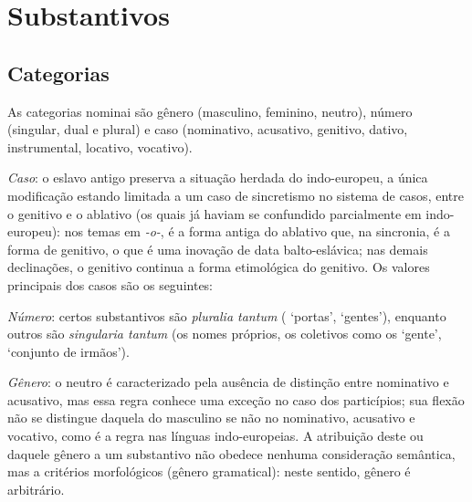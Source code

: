 \setlength{\textfloatsep}{5pt}

\section{Substantivos}

\subsection{Categorias}

As categorias nominai são gênero (masculino, feminino, neutro), número
(singular, dual e plural) e caso (nominativo, acusativo, genitivo, dativo,
instrumental, locativo, vocativo).

\emph{Caso}: o eslavo antigo preserva a situação herdada do indo-europeu, a
única modificação estando limitada a um caso de sincretismo no sistema de casos,
entre o genitivo e o ablativo (os quais já haviam se confundido parcialmente em
indo-europeu): nos temas em \emph{-o-}, é a forma antiga do ablativo que, na
sincronia, é a forma de genitivo, o que é uma inovação de data balto-eslávica;
nas demais declinações, o genitivo continua a forma etimológica do genitivo.
Os valores principais dos casos são os seguintes:



\emph{Número}: certos substantivos são \emph{pluralia tantum} (
 `portas',  
`gentes'), enquanto outros são \emph{singularia tantum} (os nomes próprios, os
coletivos como os   `gente',
 `conjunto de irmãos').

\emph{Gênero}: o neutro é caracterizado pela ausência de distinção entre
nominativo e acusativo, mas essa regra conhece uma exceção no caso dos
particípios; sua flexão não se distingue daquela do masculino se não no
nominativo, acusativo e vocativo, como é a regra nas línguas indo-europeias.
A atribuição deste ou daquele gênero a um substantivo não obedece nenhuma
consideração semântica, mas a critérios morfológicos (gênero gramatical): neste
sentido, gênero é arbitrário.

